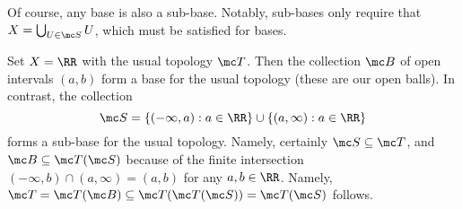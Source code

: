 \documentclass[../notes.tex]{subfiles}
\begin{document}
\begin{remark}
	Of course, any base is also a sub-base. Notably, sub-bases only require that $X=\bigcup_{U\in\mc S}U$, which must be satisfied for bases.
\end{remark}
\begin{example}
	Set $X=\RR$ with the usual topology $\mc T$. Then the collection $\mc B$ of open intervals $(a,b)$ form a base for the usual topology (these are our open balls). In contrast, the collection
	\[\mc S=\{(-\infty,a):a\in\RR\}\cup\{(a,\infty):a\in\RR\}\]
	forms a sub-base for the usual topology. Namely, certainly $\mc S\subseteq\mc T$, and $\mc B\subseteq\mc T(\mc S)$ because of the finite intersection $(-\infty,b)\cap(a,\infty)=(a,b)$ for any $a,b\in\RR$. Namely, $\mc T=\mc T(\mc B)\subseteq\mc T(\mc T(\mc S))=\mc T(\mc S)$ follows.
\end{example}
\end{document}
